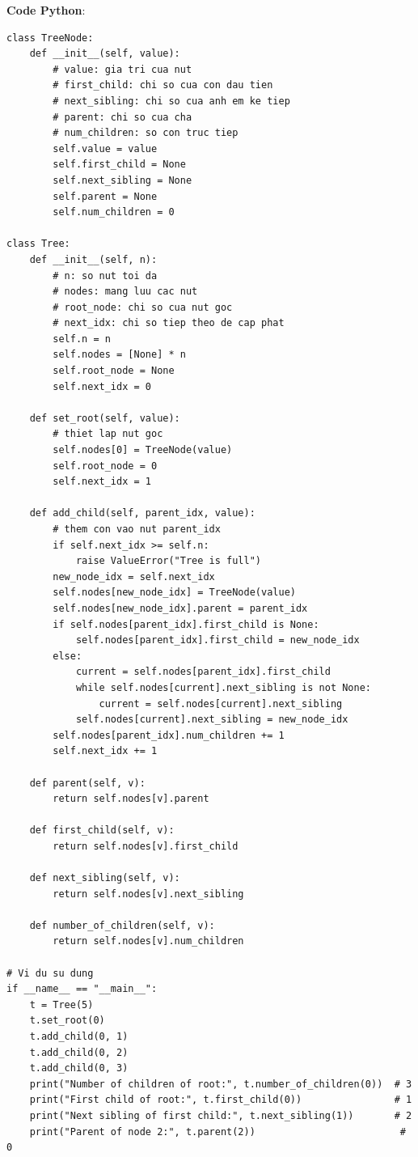 \documentclass[a4paper,12pt]{article}
\begin{document}
\textbf{Code Python}:
\begin{lstlisting}[style=commonstyle]
class TreeNode:
    def __init__(self, value):
        # value: gia tri cua nut
        # first_child: chi so cua con dau tien
        # next_sibling: chi so cua anh em ke tiep
        # parent: chi so cua cha
        # num_children: so con truc tiep
        self.value = value
        self.first_child = None
        self.next_sibling = None
        self.parent = None
        self.num_children = 0

class Tree:
    def __init__(self, n):
        # n: so nut toi da
        # nodes: mang luu cac nut
        # root_node: chi so cua nut goc
        # next_idx: chi so tiep theo de cap phat
        self.n = n
        self.nodes = [None] * n
        self.root_node = None
        self.next_idx = 0

    def set_root(self, value):
        # thiet lap nut goc
        self.nodes[0] = TreeNode(value)
        self.root_node = 0
        self.next_idx = 1

    def add_child(self, parent_idx, value):
        # them con vao nut parent_idx
        if self.next_idx >= self.n:
            raise ValueError("Tree is full")
        new_node_idx = self.next_idx
        self.nodes[new_node_idx] = TreeNode(value)
        self.nodes[new_node_idx].parent = parent_idx
        if self.nodes[parent_idx].first_child is None:
            self.nodes[parent_idx].first_child = new_node_idx
        else:
            current = self.nodes[parent_idx].first_child
            while self.nodes[current].next_sibling is not None:
                current = self.nodes[current].next_sibling
            self.nodes[current].next_sibling = new_node_idx
        self.nodes[parent_idx].num_children += 1
        self.next_idx += 1

    def parent(self, v):
        return self.nodes[v].parent

    def first_child(self, v):
        return self.nodes[v].first_child

    def next_sibling(self, v):
        return self.nodes[v].next_sibling

    def number_of_children(self, v):
        return self.nodes[v].num_children

# Vi du su dung
if __name__ == "__main__":
    t = Tree(5)
    t.set_root(0)
    t.add_child(0, 1)
    t.add_child(0, 2)
    t.add_child(0, 3)
    print("Number of children of root:", t.number_of_children(0))  # 3
    print("First child of root:", t.first_child(0))                # 1
    print("Next sibling of first child:", t.next_sibling(1))       # 2
    print("Parent of node 2:", t.parent(2))                         # 0
\end{lstlisting}
\end{document}
